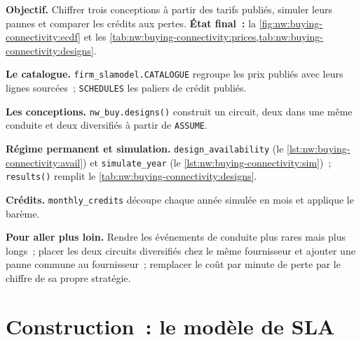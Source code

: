 \begin{tutorial}
\textbf{Objectif.} Chiffrer trois conceptions à partir des tarifs publiés, simuler leurs pannes et comparer les crédits aux pertes.
\textbf{État final~:} la \cref{fig:nw:buying-connectivity:ecdf} et les \cref{tab:nw:buying-connectivity:prices,tab:nw:buying-connectivity:designs}.
\begin{tutsteps}
\item \textbf{Le catalogue.} \texttt{firm\_slamodel.CATALOGUE} regroupe les prix publiés avec leurs lignes sourcées~; \texttt{SCHEDULES} les paliers
  de crédit publiés.
\item \textbf{Les conceptions.} \texttt{nw\_buy.designs()} construit un circuit, deux dans une même conduite et deux diversifiés à partir de \texttt{ASSUME}.
\item \textbf{Régime permanent et simulation.} \texttt{design\_availability} (le \cref{lst:nw:buying-connectivity:avail}) et \texttt{simulate\_year}
  (le \cref{lst:nw:buying-connectivity:sim})~; \texttt{results()} remplit le \cref{tab:nw:buying-connectivity:designs}.
\item \textbf{Crédits.} \texttt{monthly\_credits} découpe chaque année simulée en mois et applique le barème.
\end{tutsteps}
\textbf{Pour aller plus loin.} Rendre les événements de conduite plus rares mais plus longs~; placer les deux circuits diversifiés chez le même fournisseur et ajouter une
panne commune au fournisseur~; remplacer le coût par minute de perte par le chiffre de sa propre stratégie.
\end{tutorial}

\section{Construction~: le modèle de SLA}\label{bld:nw:buying-connectivity:slamodel}

